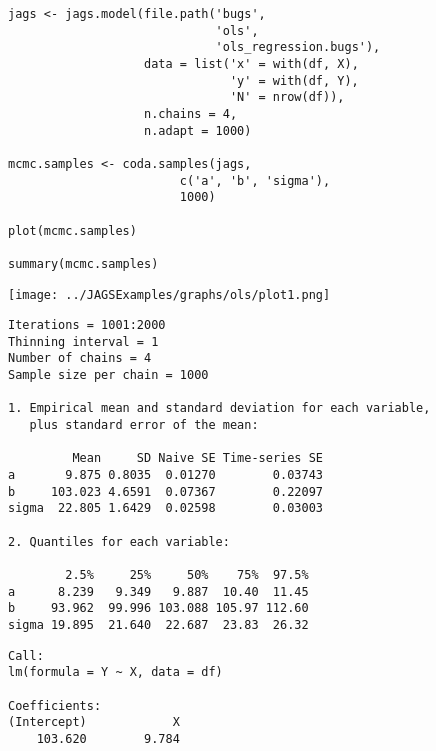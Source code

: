 \documentclass{beamer}
\begin{document}
\begin{frame}[fragile]
  \begin{verbatim}
jags <- jags.model(file.path('bugs',
                             'ols',
                             'ols_regression.bugs'),
                   data = list('x' = with(df, X),
                               'y' = with(df, Y),
                               'N' = nrow(df)),
                   n.chains = 4,
                   n.adapt = 1000)
 
mcmc.samples <- coda.samples(jags,
                        c('a', 'b', 'sigma'),
                        1000)

plot(mcmc.samples)

summary(mcmc.samples)
  \end{verbatim}
\end{frame}

\begin{frame}[fragile]
  \begin{center}
    \texttt{[image: ../JAGSExamples/graphs/ols/plot1.png]}
  \end{center}
\end{frame}

\begin{frame}[fragile]
  \begin{verbatim}
Iterations = 1001:2000
Thinning interval = 1 
Number of chains = 4 
Sample size per chain = 1000 

1. Empirical mean and standard deviation for each variable,
   plus standard error of the mean:

         Mean     SD Naive SE Time-series SE
a       9.875 0.8035  0.01270        0.03743
b     103.023 4.6591  0.07367        0.22097
sigma  22.805 1.6429  0.02598        0.03003

2. Quantiles for each variable:

        2.5%     25%     50%    75%  97.5%
a      8.239   9.349   9.887  10.40  11.45
b     93.962  99.996 103.088 105.97 112.60
sigma 19.895  21.640  22.687  23.83  26.32
  \end{verbatim}
\end{frame}

\begin{frame}[fragile]
  \begin{verbatim}
Call:
lm(formula = Y ~ X, data = df)

Coefficients:
(Intercept)            X  
    103.620        9.784  
  \end{verbatim}
\end{frame}
\end{document}
